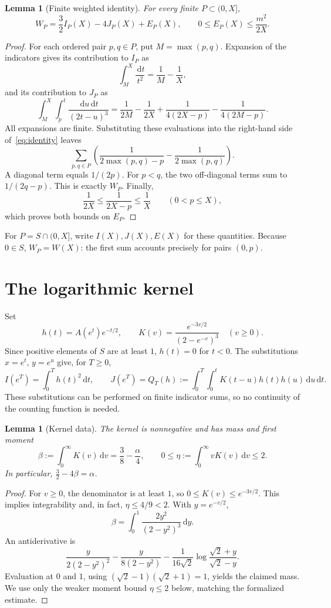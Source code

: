 \documentclass[11pt]{article}
\newtheorem{lemma}[theorem]{Lemma}
\theoremstyle{definition}\newtheorem{definition}[theorem]{Definition}
\theoremstyle{remark}\newtheorem{remark}[theorem]{Remark}
\numberwithin{equation}{section}
\newcommand{\al}{\alpha}
\newcommand{\dd}{\,\mathrm d}
\begin{document}
\begin{lemma}[Finite weighted identity]\label{lem:identity}
For every finite $P\subset(0,X]$,
\begin{equation}\label{eq:identity}
W_P=\frac32I_P(X)-4J_P(X)+E_P(X),
\qquad 0\le E_P(X)\le\frac{m^2}{2X}.
\end{equation}
\end{lemma}
\begin{proof}
For each ordered pair $p,q\in P$, put $M=\max(p,q)$. Expansion of the indicators gives its contribution to $I_P$ as
\[
\int_M^X\frac{\dd t}{t^2}=\frac1M-\frac1X,
\]
and its contribution to $J_P$ as
\begin{equation}\label{eq:nested}
\int_M^X\int_p^t\frac{\dd u\dd t}{(2t-u)^3}
=\frac1{2M}-\frac1{2X}
 +\frac1{4(2X-p)}-\frac1{4(2M-p)}.
\end{equation}
All expansions are finite. Substituting these evaluations into the right-hand side of~\eqref{eq:identity} leaves
\[
\sum_{p,q\in P}\left(\frac1{2\max(p,q)-p}-\frac1{2\max(p,q)}\right).
\]
A diagonal term equals $1/(2p)$. For $p<q$, the two off-diagonal terms sum to $1/(2q-p)$. This is exactly $W_P$. Finally,
\[
\frac1{2X}\le\frac1{2X-p}\le\frac1X \qquad(0<p\le X),
\]
which proves both bounds on $E_P$.
\end{proof}
For $P=S\cap(0,X]$, write $I(X),J(X),E(X)$ for these quantities. Because $0\in S$, $W_P=W(X)$: the first sum accounts precisely for pairs $(0,p)$.

\section{The logarithmic kernel}
Set
\[
h(t)=A(e^t)e^{-t/2},\qquad
K(v)=\frac{e^{-3v/2}}{(2-e^{-v})^3}\quad(v\ge0).
\]
Since positive elements of $S$ are at least $1$, $h(t)=0$ for $t<0$. The substitutions $x=e^t$, $y=e^u$ give, for $T\ge0$,
\begin{equation}\label{eq:logsub}
I(e^T)=\int_0^T h(t)^2\dd t,\qquad
J(e^T)=Q_T(h):=\int_0^T\int_0^t K(t-u)h(t)h(u)\dd u\dd t.
\end{equation}
These substitutions can be performed on finite indicator sums, so no continuity of the counting function is needed.

\begin{lemma}[Kernel data]\label{lem:kernel}
The kernel is nonnegative and has mass and first moment
\[
\beta:=\int_0^\infty K(v)\dd v=\frac38-\frac\al4,
\qquad
0\le\eta:=\int_0^\infty vK(v)\dd v\le2.
\]
In particular, $\frac32-4\beta=\al$.
\end{lemma}
\begin{proof}
For $v\ge0$, the denominator is at least $1$, so $0\le K(v)\le e^{-3v/2}$. This implies integrability and, in fact, $\eta\le4/9<2$. With $y=e^{-v/2}$,
\[
\beta=\int_0^1\frac{2y^2}{(2-y^2)^3}\dd y.
\]
An antiderivative is
\[
\frac{y}{2(2-y^2)^2}-\frac{y}{8(2-y^2)}
 -\frac1{16\sqrt2}\log\frac{\sqrt2+y}{\sqrt2-y}.
\]
Evaluation at $0$ and $1$, using $(\sqrt2-1)(\sqrt2+1)=1$, yields the claimed mass. We use only the weaker moment bound $\eta\le2$ below, matching the formalized estimate.
\end{proof}
\end{document}
